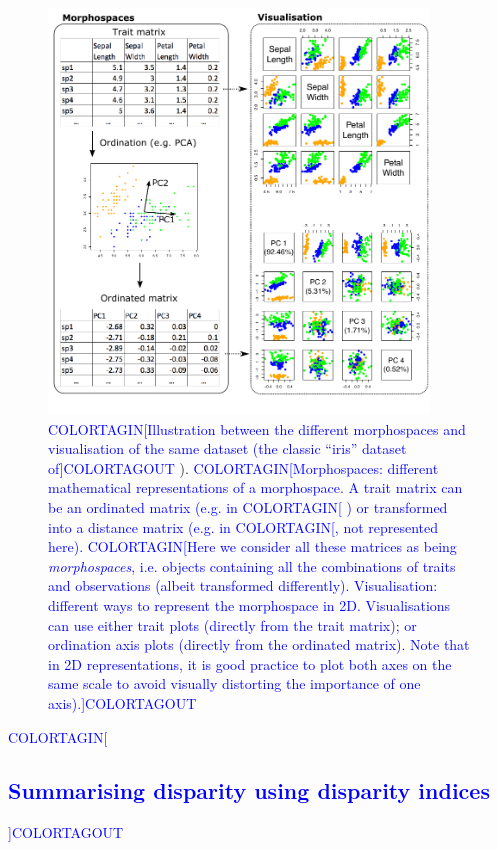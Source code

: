 \documentclass[12pt,letterpaper]{article}
\begin{document}
\begin{figure}[!htbp]
\centering
   \includegraphics[width=0.9\textwidth]{Figures/figure_space2.pdf}
\caption{
    \textcolor{blue}{COLORTAGIN[Illustration between the different morphospaces and visualisation of the same dataset (the classic ``iris'' dataset of]COLORTAGOUT} \citealt{edgar1935irises,fisher1936use}).
    \textcolor{blue}{COLORTAGIN[Morphospaces: different mathematical representations of a morphospace. A trait matrix can be an ordinated matrix (e.g. in }\citealt{tyler2011detecting}\textcolor{blue}{COLORTAGIN[ ) or transformed into a distance matrix (e.g. in }\citealt{Close2015}\textcolor{blue}{COLORTAGIN[, not represented here).}
    \textcolor{blue}{COLORTAGIN[Here we consider all these matrices as being \textit{morphospaces}, i.e. objects containing all the combinations of traits and observations (albeit transformed differently).
    Visualisation: different  ways to represent the morphospace in 2D.
    Visualisations can use either trait plots (directly from the trait matrix); or ordination axis plots (directly from the ordinated matrix).
    Note that in 2D representations, it is good practice to plot both axes on the same scale to avoid visually distorting the importance of one axis).]COLORTAGOUT}
}
\label{Fig:morphospace}
\end{figure}

\textcolor{blue}{COLORTAGIN[\subsection{Summarising disparity using disparity indices}]COLORTAGOUT \label{section:metrics}}
\end{document}
